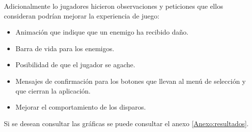 Adicionalmente lo jugadores hicieron observaciones y peticiones que ellos 
consideran podrían mejorar la experiencia de juego:
\begin{itemize}
        \item Animación que indique que un enemigo ha recibido daño.
        \item Barra de vida para los enemigos.
        \item Posibilidad de que el jugador se agache.
        \item Mensajes de confirmación para los botones que llevan al menú de selección y 
        que cierran la aplicación.
        \item Mejorar el comportamiento de los disparos.
\end{itemize} 
Si se desean consultar las gráficas se puede consultar el anexo \ref{Anexo:resultados}.
